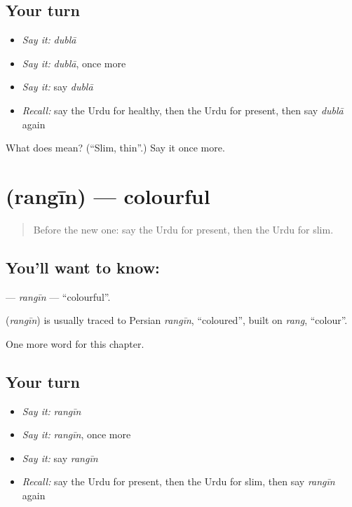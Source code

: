 \subsection*{Your turn}
\begin{itemize}
\raggedright
  \item \emph{Say it:} \emph{dublā}
  \item \emph{Say it:} \emph{dublā}, once more
  \item \emph{Say it:} say \emph{dublā}
  \item \emph{Recall:} say the Urdu for healthy, then the Urdu for present, then say \emph{dublā} again
\end{itemize}

\begin{tcolorbox}[breakable,colback=teal!4,colframe=teal!35!black,title={Before you move on}]
What does  mean? (\textquotedblleft{}Slim, thin\textquotedblright{}.) Say it once more.
\end{tcolorbox}
\section[\texorpdfstring{\ur{رنگین} (rangīn)}{رنگین (rangīn)}]{ (rangīn) — colourful}

\label{lesson:UR-C249-rangin}



\begin{quote}
Before the new one: say the Urdu for present, then the Urdu for slim.
\end{quote}

\subsection*{You'll want to know: }
\textbf{} — \emph{rangīn} — \textquotedblleft{}colourful\textquotedblright{}.

\begin{cousinweb}
\textbf{} (\emph{rangīn}) is usually traced to Persian \emph{rangīn}, \textquotedblleft{}coloured\textquotedblright{}, built on \emph{rang}, \textquotedblleft{}colour\textquotedblright{}.
\end{cousinweb}

\begin{grammarlens}[title={What you've built}]
One more word for this chapter.
\end{grammarlens}

\subsection*{Your turn}
\begin{itemize}
\raggedright
  \item \emph{Say it:} \emph{rangīn}
  \item \emph{Say it:} \emph{rangīn}, once more
  \item \emph{Say it:} say \emph{rangīn}
  \item \emph{Recall:} say the Urdu for present, then the Urdu for slim, then say \emph{rangīn} again
\end{itemize}


